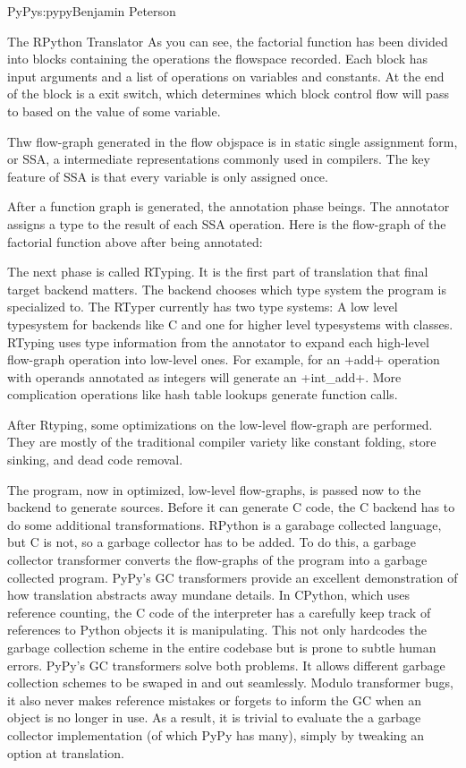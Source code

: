 \begin{aosachapter}{PyPy}{s:pypy}{Benjamin Peterson}
\begin{aosasect1}{The RPython Translator}
As you can see, the factorial function has been divided into blocks containing
the operations the flowspace recorded. Each block has input arguments and a list
of operations on variables and constants. At the end of the block is a exit
switch, which determines which block control flow will pass to based on the
value of some variable.

Thw flow-graph generated in the flow objspace is in static single assignment
form, or SSA, a intermediate representations commonly used in compilers. The key
feature of SSA is that every variable is only assigned once.

After a function graph is generated, the annotation phase beings. The annotator
assigns a type to the result of each SSA operation. Here is the flow-graph of the
factorial function above after being annotated:


The next phase is called RTyping. It is the first part of translation that final
target backend matters. The backend chooses which type system the program is
specialized to. The RTyper currently has two type systems: A low level
typesystem for backends like C and one for higher level typesystems with
classes. RTyping uses type information from the annotator to expand each
high-level flow-graph operation into low-level ones. For example, for an +add+
operation with operands annotated as integers will generate an +int\_add+. More
complication operations like hash table lookups generate function calls.

After Rtyping, some optimizations on the low-level flow-graph are performed. They
are mostly of the traditional compiler variety like constant folding, store
sinking, and dead code removal.

The program, now in optimized, low-level flow-graphs, is passed now to the
backend to generate sources. Before it can generate C code, the C backend has to
do some additional transformations. RPython is a garabage collected language,
but C is not, so a garbage collector has to be added. To do this, a garbage
collector transformer converts the flow-graphs of the program into a garbage
collected program. PyPy's GC transformers provide an excellent demonstration of
how translation abstracts away mundane details. In CPython, which uses reference
counting, the C code of the interpreter has a carefully keep track of references
to Python objects it is manipulating. This not only hardcodes the garbage
collection scheme in the entire codebase but is prone to subtle human
errors. PyPy's GC transformers solve both problems. It allows different garbage
collection schemes to be swaped in and out seamlessly. Modulo transformer bugs,
it also never makes reference mistakes or forgets to inform the GC when an
object is no longer in use. As a result, it is trivial to evaluate the a garbage
collector implementation (of which PyPy has many), simply by tweaking an option
at translation.


\end{aosasect1}
\end{aosachapter}
